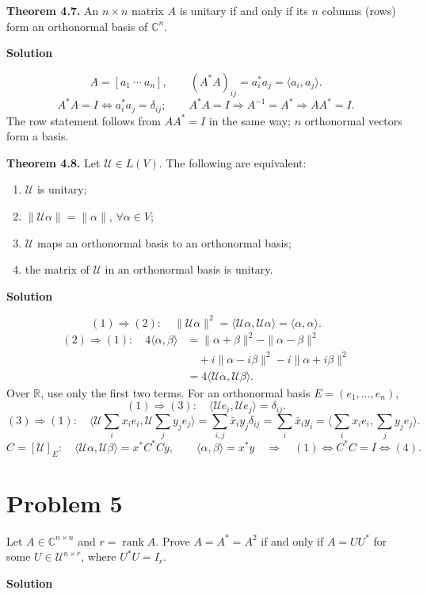 \documentclass[UTF8,10pt,letterpaper,fontset=fandol]{ctexart}
\newcommand{\C}{\mathbb C}
\newcommand{\R}{\mathbb R}
\newcommand{\ip}[2]{\langle #1,#2\rangle}
\DeclareMathOperator{\rank}{rank}
\begin{document}
\textbf{Theorem 4.7.} An $n\times n$ matrix $A$ is unitary if and only if its $n$ columns (rows) form an orthonormal basis of $\C^n$.
\par{}\textbf{Solution}\par

\[
 A=[a_1\ \cdots\ a_n],\qquad
 (A^*A)_{ij}=a_i^*a_j=\ip{a_i}{a_j}.
\]
\[
 A^*A=I\iff a_i^*a_j=\delta_{ij};\qquad
 A^*A=I\Longrightarrow A^{-1}=A^*\Longrightarrow AA^*=I.
\]
The row statement follows from $AA^*=I$ in the same way; $n$ orthonormal vectors form a basis.

\medskip
\textbf{Theorem 4.8.} Let $\mathcal U\in L(V)$. The following are equivalent:
\begin{enumerate}
\item $\mathcal U$ is unitary;
\item $\|\mathcal U\alpha\|=\|\alpha\|$, $\forall\alpha\in V$;
\item $\mathcal U$ maps an orthonormal basis to an orthonormal basis;
\item the matrix of $\mathcal U$ in an orthonormal basis is unitary.
\end{enumerate}

\par{}\textbf{Solution}\par

\[
 (1)\Longrightarrow(2):\quad
 \|\mathcal U\alpha\|^2=\ip{\mathcal U\alpha}{\mathcal U\alpha}=\ip\alpha\alpha.
\]
\begin{align*}
 (2)\Longrightarrow(1):\quad
 4\ip\alpha\beta
 &=\|\alpha+\beta\|^2-\|\alpha-\beta\|^2\\
 &\quad+i\|\alpha-i\beta\|^2-i\|\alpha+i\beta\|^2\\
 &=4\ip{\mathcal U\alpha}{\mathcal U\beta}.
\end{align*}
Over $\R$, use only the first two terms. For an orthonormal basis $E=(e_1,\ldots,e_n)$,
\[
 (1)\Longrightarrow(3):\quad
 \ip{\mathcal Ue_i}{\mathcal Ue_j}=\delta_{ij}.
\]
\[
 (3)\Longrightarrow(1):\quad
 \ip{\mathcal U\sum_i x_ie_i}{\mathcal U\sum_j y_je_j}
 =\sum_{i,j}\bar x_i y_j\delta_{ij}
 =\sum_i\bar x_i y_i=\ip{\sum_i x_ie_i}{\sum_j y_je_j}.
\]
\[
 C=[\mathcal U]_E:\quad
 \ip{\mathcal U\alpha}{\mathcal U\beta}=x^*C^*Cy,\qquad
 \ip\alpha\beta=x^*y
 \quad\Longrightarrow\quad (1)\iff C^*C=I\iff(4).
\]
\section{Problem 5}
Let $A\in\C^{n\times n}$ and $r=\rank A$. Prove $A=A^*=A^2$ if and only if $A=UU^*$ for some $U\in\mathcal U^{n\times r}$, where $U^*U=I_r$.
\par{}\textbf{Solution}\par
\end{document}
